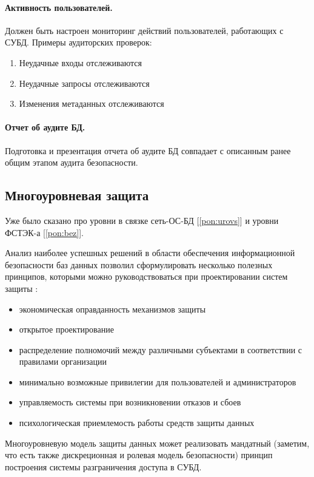 \paragraph{Активность пользователей.}

Должен быть настроен мониторинг действий пользователей, работающих с СУБД. Примеры аудиторских проверок:

\begin{enumerate}
	\item Неудачные входы отслеживаются
	\item Неудачные запросы отслеживаются
	\item Изменения метаданных отслеживаются
\end{enumerate}

\paragraph{Отчет об аудите БД.}

Подготовка и презентация отчета об аудите БД совпадает с описанным ранее общим этапом аудита безопасности.

\clearpage

\subsection{Многоуровневая защита}
Уже было сказано про уровни в связке сеть-ОС-БД [\ref{pon:urovs}] и уровни ФСТЭК-а [\ref{pon:bez}].

Анализ наиболее успешных решений в области обеспе­чения информационной безопасности баз данных позволил сформулировать несколько полезных принципов, которыми можно руководствоваться при проектировании систем защиты \autocite{Smirnov2007}:
\begin{itemize}
	\item экономическая оправданность механизмов защиты
	\item открытое проектирование
	\item распределение полномочий между различными субъектами в соответствии с правилами организации
	\item минимально возможные привилегии для пользователей и администраторов
	\item управляемость системы при возникновении отказов и сбоев
	\item психологическая приемлемость работы средств защиты данных
\end{itemize}

Многоуровневую модель защиты данных может реализовать мандатный (заметим, что есть также дискреционная и ролевая модель безопасности) принцип построения системы разграничения доступа в СУБД.

